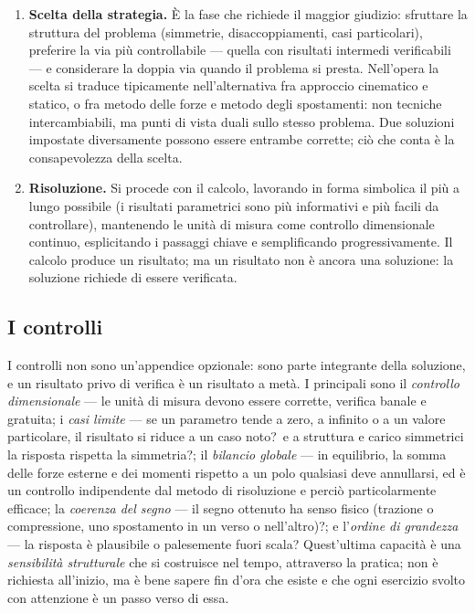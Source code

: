 \begin{enumerate}[label=\textbf{\arabic*.}, leftmargin=*]
	\item \textbf{Scelta della strategia.} È la fase che richiede il maggior
	giudizio: sfruttare la struttura del problema (simmetrie, disaccoppiamenti,
	casi particolari), preferire la via più controllabile --- quella con
	risultati intermedi verificabili --- e considerare la doppia via quando il
	problema si presta. Nell'opera la scelta si traduce tipicamente
	nell'alternativa fra approccio cinematico e statico, o fra metodo delle
	forze e metodo degli spostamenti: non tecniche intercambiabili, ma punti di
	vista duali sullo stesso problema. Due soluzioni impostate diversamente
	possono essere entrambe corrette; ciò che conta è la consapevolezza della
	scelta.
	
	\item \textbf{Risoluzione.} Si procede con il calcolo, lavorando in forma
	simbolica il più a lungo possibile (i risultati parametrici sono più
	informativi e più facili da controllare), mantenendo le unità di misura come
	controllo dimensionale continuo, esplicitando i passaggi chiave e
	semplificando progressivamente. Il calcolo produce un risultato; ma un
	risultato non è ancora una soluzione: la soluzione richiede di essere
	verificata.
\end{enumerate}

\subsection{I controlli}

I controlli non sono un'appendice opzionale: sono parte integrante della
soluzione, e un risultato privo di verifica è un risultato a metà. I
principali sono il \emph{controllo dimensionale} --- le unità di misura devono
essere corrette, verifica banale e gratuita; i \emph{casi limite} --- se un
parametro tende a zero, a infinito o a un valore particolare, il risultato si
riduce a un caso noto?\ e a struttura e carico simmetrici la risposta rispetta
la simmetria?; il \emph{bilancio globale} --- in equilibrio, la somma delle
forze esterne e dei momenti rispetto a un polo qualsiasi deve annullarsi, ed è
un controllo indipendente dal metodo di risoluzione e perciò particolarmente
efficace; la \emph{coerenza del segno} --- il segno ottenuto ha senso fisico
(trazione o compressione, uno spostamento in un verso o nell'altro)?; e
l'\emph{ordine di grandezza} --- la risposta è plausibile o palesemente fuori
scala? Quest'ultima capacità è una \emph{sensibilità strutturale} che si
costruisce nel tempo, attraverso la pratica; non è richiesta all'inizio, ma è
bene sapere fin d'ora che esiste e che ogni esercizio svolto con attenzione è
un passo verso di essa.

